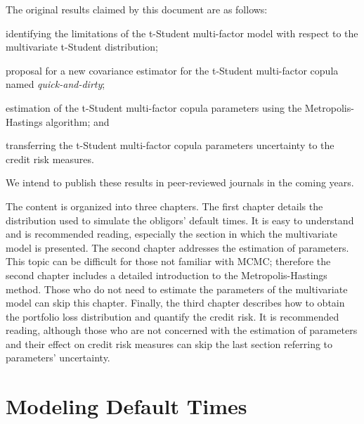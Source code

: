 \documentclass[11pt,fleqn]{book} %
\begin{document}
The original results claimed by this document are as follows: 
\begin{inparaenum}[1)]
	\item identifying the limitations of the t-Student multi-factor model with 
	respect to the multivariate t-Student distribution;
	\item proposal for a new covariance estimator for the t-Student multi-factor 
	copula named \emph{quick-and-dirty};
	\item estimation of the t-Student multi-factor copula parameters using the 
	Metropolis-Hastings algorithm; and
	\item transferring the t-Student multi-factor copula parameters uncertainty 
	to the credit risk measures.
\end{inparaenum}
We intend to publish these results in peer-reviewed journals in the coming 
years.

The content is organized into three chapters. The first chapter details the 
distribution used to simulate the obligors' default times. It is easy to 
understand and is recommended reading, especially the section in which the 
multivariate model is presented. The second chapter addresses the estimation 
of parameters. This topic can be difficult for those not familiar with MCMC; 
therefore the second chapter includes a detailed introduction to the 
Metropolis-Hastings method. Those who do not need to estimate the parameters 
of the multivariate model can skip this chapter. Finally, the 
third chapter describes how to obtain the portfolio loss distribution and 
quantify the credit risk. It is recommended reading, although those who are 
not concerned with the estimation of parameters and their effect on credit 
risk measures can skip the last section referring to parameters' uncertainty. 



\chapter{Modeling Default Times}
\label{chap:mdt}
\end{document}
